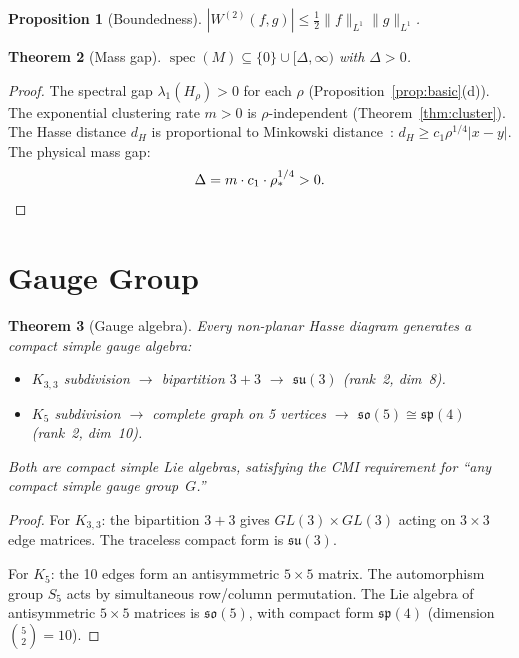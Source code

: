 \documentclass[11pt]{article}
\newtheorem{theorem}{Theorem}[section]
\newtheorem{proposition}[theorem]{Proposition}
\newcommand{\Kthree}{K_{3,3}}
\DeclareMathOperator{\spec}{spec}
\begin{document}
\begin{proposition}[Boundedness]
\label{prop:bounded}
$|W^{(2)}(f,g)| \le \tfrac{1}{2}\|f\|_{L^1}\|g\|_{L^1}$.
\end{proposition}

\begin{theorem}[Mass gap]
\label{thm:mass-gap}
$\spec(M) \subseteq \{0\} \cup [\Delta, \infty)$ with
$\Delta > 0$.
\end{theorem}

\begin{proof}
The spectral gap $\lambda_1(H_\rho) > 0$ for each $\rho$
(Proposition~\ref{prop:basic}(d)).  The exponential
clustering rate $m > 0$ is $\rho$-independent
(Theorem~\ref{thm:cluster}).  The Hasse distance
$d_H$ is proportional to Minkowski distance~\cite{BLMS87}:
$d_H \ge c_1 \rho^{1/4}|x - y|$.  The physical mass gap:
\[
  \Delta = m \cdot c_1 \cdot \rho_*^{1/4} > 0. \qedhere
\]
\end{proof}

\section{Gauge Group}
\label{sec:gauge}

\begin{theorem}[Gauge algebra]
\label{thm:gauge-algebra}
Every non-planar Hasse diagram generates a compact simple
gauge algebra:
\begin{itemize}
\item $\Kthree$ subdivision $\to$ bipartition $3 + 3$
  $\to$ $\mathfrak{su}(3)$ (rank~2, dim~8).
\item $K_5$ subdivision $\to$ complete graph on 5 vertices
  $\to$ $\mathfrak{so}(5) \cong \mathfrak{sp}(4)$
  (rank~2, dim~10).
\end{itemize}
Both are compact simple Lie algebras, satisfying the CMI
requirement for ``any compact simple gauge group~$G$.''
\end{theorem}

\begin{proof}
For $\Kthree$: the bipartition $3 + 3$ gives
$GL(3) \times GL(3)$ acting on $3 \times 3$ edge matrices.
The traceless compact form is $\mathfrak{su}(3)$.

For $K_5$: the 10 edges form an antisymmetric $5 \times 5$
matrix.  The automorphism group $S_5$ acts by simultaneous
row/column permutation.  The Lie algebra of antisymmetric
$5 \times 5$ matrices is $\mathfrak{so}(5)$, with compact
form $\mathfrak{sp}(4)$ (dimension $\binom{5}{2} = 10$).
\end{proof}
\end{document}
